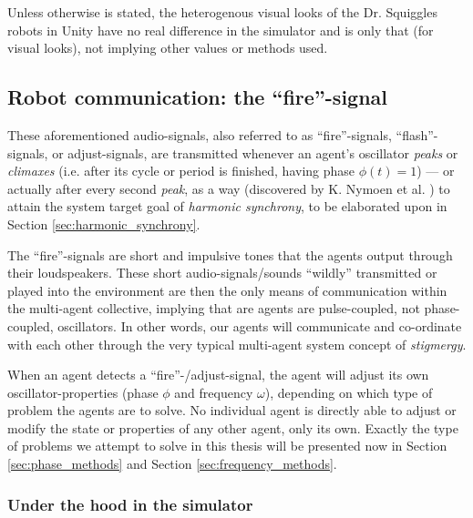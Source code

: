 	Unless otherwise is stated, the heterogenous visual looks of the Dr. Squiggles robots in Unity have no real difference in the simulator and is only that (for visual looks), not implying other values or methods used.

	
	\subsection{Robot communication: the ``fire''-signal}
	\label{subsec:fire_signal}
	
		
		

	These aforementioned audio-signals, also referred to as ``fire''-signals, ``flash''-signals, or adjust-signals, are transmitted whenever an agent's oscillator \textit{peaks} or \textit{climaxes} (i.e. after its cycle or period is finished, having phase $\phi(t)=1$) — or actually after every second \textit{peak}, as a way (discovered by K. Nymoen et al. \cite{nymoen_synch}) to attain the system target goal of \textit{harmonic synchrony}, to be elaborated upon in Section \ref{sec:harmonic_synchrony}.

	The ``fire''-signals are short and impulsive tones that the agents output through their loudspeakers. These short audio-signals/sounds ``wildly'' transmitted or played into the environment are then the only means of communication within the multi-agent collective, implying that are agents are pulse-coupled, not phase-coupled, oscillators. In other words, our agents will communicate and co-ordinate with each other through the very typical multi-agent system concept of \textit{stigmergy}.

	When an agent detects a ``fire''-/adjust-signal, the agent will adjust its own oscillator-properties (phase $\phi$ and frequency $\omega$), depending on which type of problem the agents are to solve. No individual agent is directly able to adjust or modify the state or properties of any other agent, only its own. Exactly the type of problems we attempt to solve in this thesis will be presented now in Section \ref{sec:phase_methods} and Section \ref{sec:frequency_methods}.
	

		\subsubsection{Under the hood in the simulator}
		
